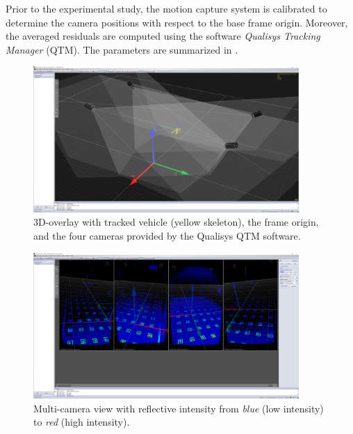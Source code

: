 Prior to the experimental study, the motion capture system is calibrated to determine the camera positions with respect to the base frame origin. 
Moreover, the averaged residuals are computed using the software \textit{Qualisys Tracking Manager} (QTM).
The parameters are summarized in .


\begin{figure}
    \centering
    \includegraphics[width=0.9\textwidth]{images/04/qtm_3d_overlay.png}
    \caption{3D-overlay with tracked vehicle (yellow skeleton), the frame origin, and the four cameras provided by the Qualisys QTM software.}
    \label{fig:qtm_3d}
\end{figure}

\begin{figure}
    \centering
    \includegraphics[width=0.9\textwidth]{images/04/qtm_multi_cam_intensity.png}
    \caption{Multi-camera view with reflective intensity from \textit{blue} (low intensity) to \textit{red} (high intensity).}
    \label{fig:qtm_intensity}
\end{figure}


